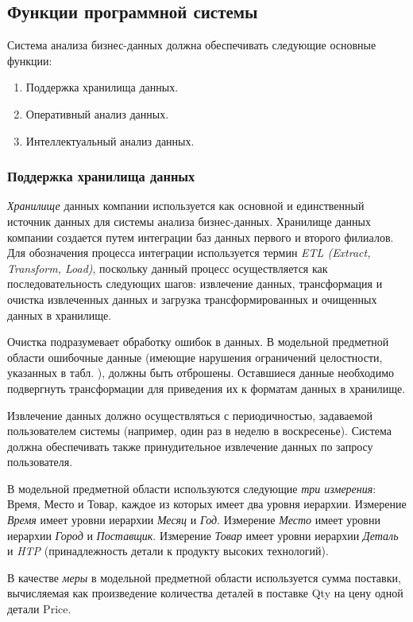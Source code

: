 \subsection{Функции программной системы}
Система анализа бизнес-данных должна обеспечивать следующие основные функции:
\begin{enumerate}
  \item Поддержка хранилища данных.
  \item Оперативный анализ данных.
  \item Интеллектуальный анализ данных.
\end{enumerate}

\subsubsection{Поддержка хранилища данных}
\textit{Хранилище} данных компании используется как основной и единственный источник данных для системы анализа бизнес-данных. Хранилище данных компании создается путем интеграции баз данных первого и второго филиалов. Для обозначения процесса интеграции используется термин \textit{ETL (Extract, Transform, Load)}, поскольку данный процесс осуществляется как последовательность следующих шагов: извлечение данных, трансформация и очистка извлеченных данных и загрузка трансформированных и очищенных данных в хранилище. \par
Очистка подразумевает обработку ошибок в данных. В модельной предметной области ошибочные данные (имеющие нарушения ограничений целостности, указанных в табл. ), должны быть отброшены. Оставшиеся данные необходимо подвергнуть трансформации для приведения их к форматам данных в хранилище.\par
Извлечение данных должно осуществляться с периодичностью, задаваемой пользователем системы (например, один раз в неделю в воскресенье). Система должна обеспечивать также принудительное извлечение данных по запросу пользователя.\par
В модельной предметной области используются следующие \textit{три измерения}: Время, Место и Товар, каждое из которых имеет два уровня иерархии. Измерение \textit{Время} имеет уровни иерархии \textit{Месяц} и \textit{Год}. Измерение \textit{Место} имеет уровни иерархии \textit{Город} и \textit{Поставщик}. Измерение \textit{Товар} имеет уровни иерархии \textit{Деталь} и \textit{HTP} 
(принадлежность детали к продукту высоких технологий).\par
В качестве \textit{меры} в модельной предметной области используется сумма поставки, вычисляемая как произведение количества деталей в поставке Qty на цену одной детали Price.\par

